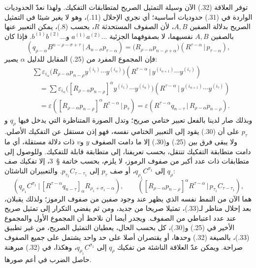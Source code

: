 \documentclass[11pt]{article}
\providecommand{\pair}[2]{(#1\,|\,#2)}
\providecommand{\eps}{\varepsilon}
\begin{document}
توفر العلاقة (32.) الآن وسيلة التمثيل الصريح لمتطابقات التفكيك. ولهذا نعدّ الحدوديات الواردة في (31.) حدوديات أساسية؛ أي نجري الإحلال (11.)، وهو لا يغير شيئا في التمثيل الصريح بدلالة الصفين $A,B$، لأن الصفوف المستحدثة $R$، بحسب (8.)، يمكن التعبير عنها بالصفين $A,B$ نفسيهما، لا بصفوفهما الجزئية $a^{(1)}a^{(2)}\ldots$ و$b^{(1)}b^{(2)}\ldots$. فإذا كان
\begin{equation}
 \pair{q_{\rho-\alpha}B^{n-\rho-\sigma+\tau}}{A_{n-\sigma}p_{\tau-\alpha}}
 =\bigl(R_{\rho-\alpha}p_{n-\rho+\alpha}\bigr)
  \pair{R^{\tau-\alpha}}{p_{\tau-\alpha}},
\tag{33}
\end{equation}
فإن المجموع المفرد من (25.) المقابل للدليل $\alpha$ يصير:
\begin{equation}
\begin{aligned}
&\sum \eps_{i_\alpha}\bigl(R_{\rho-\alpha}p_{n-\rho}y^{(i_1)}\cdots y^{(i_\alpha)}\bigr)
 \pair{R^{\tau-\alpha}}{y^{(i_{\alpha+1})}\cdots y^{(i_\tau)}}\\
&\quad=\sum \eps_{i_\alpha}\bigl([R_{\rho-\alpha}p_{n-\rho}]^\alpha y^{(i_1)}\cdots y^{(i_\alpha)}\bigr)
 \pair{R^{\tau-\alpha}}{y^{(i_{\alpha+1})}\cdots y^{(i_\tau)}}\\
&\quad=\eps\pair{[R_{\rho-\alpha}p_{n-\rho}]^\alpha R^{\tau-\alpha}}{p_\tau}
 =\eps\pair{R^{\tau-\alpha}q_{n-\tau}}{R_{\rho-\alpha}p_{n-\rho}}.
\end{aligned}
\tag{34}
\end{equation}
وبذلك صار لدينا بالفعل تعبير ختامي صريح؛ وتدل الصورة المتناظرة التي يدخل فيها $q_\rho$ و$p_\tau$ على أن (30.) يقود إلى التعبير الختامي نفسه، فهو إذن مستقل عن التفكيك الأصلي. ولا يبقى فرق بين (25.) و(30.) إلا ما دامت الصفوف $y$ و$v$ ذات دلالة مستقلة، أي ما دامت متطابقة التفكيك تنتقل، بحسب تعريفنا، إلى متطابقة قابلة للتفكيك. وللوصول إلى متطابقات ذات عدد أكبر من صفوف الرموز، لا يلزم، بحسب خاتمة \S\ 3، إلا تفكيك صف $q_\rho$ إلى $q_{\rho_1}C^{\sigma_1}$، أو صف $p_\tau$ إلى $p_{\tau_1}C_{\tau-\tau_1}$. والتعبيران الناشئان:
\begin{equation}
 \pair{q_{\rho_1}C^{\sigma_1}}{[R^{\tau-\alpha}q_{n-\tau}]_\alpha R_{\rho_1+\sigma_1-\alpha}},
 \qquad
 \pair{[R_{\rho-\alpha}p_{n-\rho}]^\alpha R^{\tau-\alpha}}{p_{\tau_1}C_{\tau-\tau_1}},
\tag{35}
\end{equation}
هما الآن من النمط نفسه الذي يظهر عند وجود صفين من صفوف الرموز؛ ولذلك يقبلان، بعد إحلال مناظر لـ(33.)، تمثيلا صريحا من جديد، ومن ثم يفضي التكرار إلى تمثيل صريح عند عدد اعتباطي من الصفوف. ويجدر أيضا أن نلاحظ أن المجموع الأول والمجموع الأخير في (25.) و(30.)، كل بحسب الحال، يعطيان التمثيل الصريح، من غير تطبيق (33.)، بالصيغة (32.) وحدها، أو يقتصران أصلا على حد واحد يشتمل على جميع الصفوف صراحة. ويمكن عدّ العلاقة الناشئة من تفكيك $q_\rho$ إلى $q_{\rho_1}C^{\sigma_1}$، وهكذا، في (32.) مبرهنة حاصل الضرب في أعم صورها.
\end{document}

